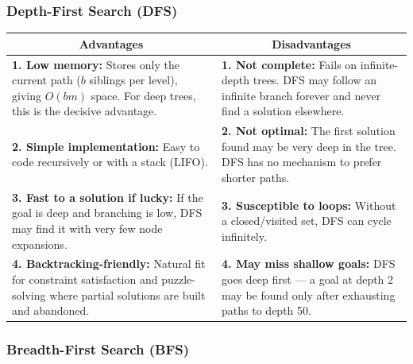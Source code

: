 \documentclass[12pt, a4paper]{article}
\begin{document}
\subsubsection*{Depth-First Search (DFS)}

\begin{center}
\renewcommand{\arraystretch}{1.4}
\begin{tabular}{p{5.5cm}|p{5.5cm}}
\toprule
\multicolumn{1}{c|}{\textbf{Advantages}} & \multicolumn{1}{c}{\textbf{Disadvantages}} \\
\midrule
\textbf{1. Low memory:} Stores only the current path ($b$ siblings per level), giving $O(bm)$ space. For deep trees, this is the decisive advantage. &
\textbf{1. Not complete:} Fails on infinite-depth trees. DFS may follow an infinite branch forever and never find a solution elsewhere. \\
\midrule
\textbf{2. Simple implementation:} Easy to code recursively or with a stack (LIFO). &
\textbf{2. Not optimal:} The first solution found may be very deep in the tree. DFS has no mechanism to prefer shorter paths. \\
\midrule
\textbf{3. Fast to a solution if lucky:} If the goal is deep and branching is low, DFS may find it with very few node expansions. &
\textbf{3. Susceptible to loops:} Without a closed/visited set, DFS can cycle infinitely. \\
\midrule
\textbf{4. Backtracking-friendly:} Natural fit for constraint satisfaction and puzzle-solving where partial solutions are built and abandoned. &
\textbf{4. May miss shallow goals:} DFS goes deep first — a goal at depth 2 may be found only after exhausting paths to depth 50. \\
\bottomrule
\end{tabular}
\end{center}

\subsubsection*{Breadth-First Search (BFS)}
\end{document}
